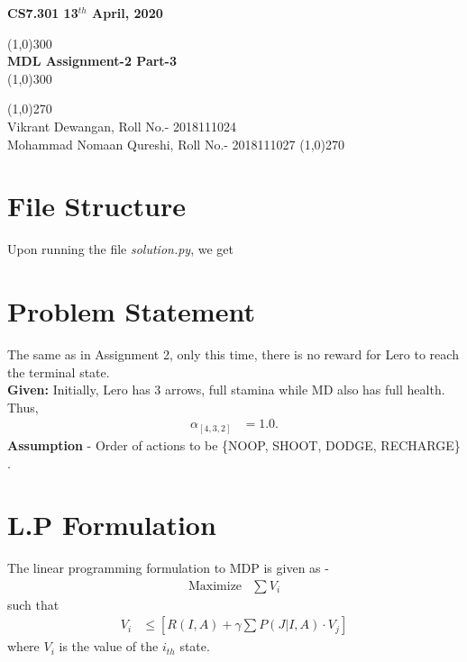 \documentclass[11pt]{article}
\begin{document}
	\begin{titlepage}
		\begin{flushleft}
			
			\bf CS7.301
			\hfill
			\bfseries 13$^{th}$ April, 2020
		\end{flushleft}
		\begin{center}
			\line(1,0){300}\\
			[5mm]
			\huge{\bfseries MDL Assignment-2 Part-3}\\
			\line(1,0){300}\\
			[12cm]
		\end{center}
		\begin{flushright}
			{
				\line(1,0){270}\\
				\large  Vikrant Dewangan, Roll No.- 2018111024\\  Mohammad Nomaan Qureshi,
				Roll No.- 2018111027
				\line(1,0){270}\\	
			}
		\end{flushright}
	\end{titlepage}
	\newpage
	\tableofcontents
	\newpage
	\section{File Structure}
	Upon running the file \textit{solution.py}, we get 

	\section{Problem Statement}
	The same as in Assignment 2, only this time, there is no reward for Lero to reach the terminal state. \\
	\textbf{Given:} Initially, Lero has 3 arrows, full stamina while MD also has full health. 
	Thus, 
	\begin{align*}
		\alpha_{[4,3,2]} &= 1.0.		
	\end{align*}
	\textbf{Assumption} - Order of actions to be \{NOOP, SHOOT, DODGE, RECHARGE\} .
	\section{L.P Formulation}
	The linear programming formulation to MDP is given as - 
	\begin{align*}
		\text{Maximize} & \sum V_i
	\end{align*}
	such that 
	\begin{align*}
		V_i & \leq [R(I,A) + \gamma \sum P(J|I,A) \cdot V_j]
	\end{align*}
	where $V_i$ is the value of the $i_{th}$ state.
\end{document}
